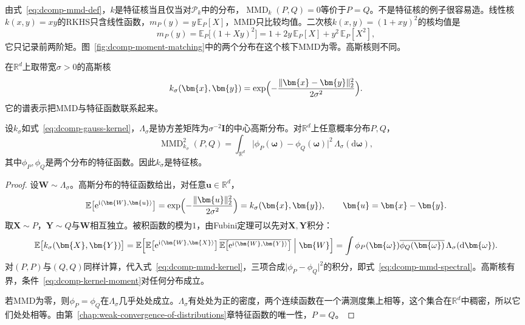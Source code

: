 由式~\eqref{eq:dcomp-mmd-def}，$k$是特征核当且仅当对$\mathcal{P}_k$中的分布，$\operatorname{MMD}_k(P,Q)=0$等价于$P=Q$。不是特征核的例子很容易造。线性核$k(x,y)=xy$的RKHS只含线性函数，$m_P(y)=y\,\mathbb{E}_{P}[X]$，MMD只比较均值。二次核$k(x,y)=(1+xy)^{2}$的核均值是
\[
 m_P(y)=\mathbb{E}_{P}\bigl[(1+Xy)^{2}\bigr]=1+2y\,\mathbb{E}_{P}[X]+y^{2}\,\mathbb{E}_{P}[X^{2}],
\]
它只记录前两阶矩。图~\ref{fig:dcomp-moment-matching}中的两个分布在这个核下MMD为零。高斯核则不同。

在$\mathbb{R}^{d}$上取带宽$\sigma>0$的高斯核
\begin{equation}
 k_\sigma(\bm{x},\bm{y})=\exp\Bigl(-\frac{\lVert\bm{x}-\bm{y}\rVert_2^{2}}{2\sigma^{2}}\Bigr) .
 \label{eq:dcomp-gauss-kernel}
\end{equation}
它的谱表示把MMD与特征函数联系起来。

\begin{theorem}[高斯核的谱表示]
\label{thm:dcomp-gauss-characteristic}
设$k_\sigma$如式~\eqref{eq:dcomp-gauss-kernel}，$\Lambda_\sigma$是协方差矩阵为$\sigma^{-2}\bm{I}$的中心高斯分布。对$\mathbb{R}^{d}$上任意概率分布$P,Q$，
\begin{equation}
 \operatorname{MMD}_{k_\sigma}^{2}(P,Q)=\int_{\mathbb{R}^{d}}\bigl\lvert\phi_P(\bm{\omega})-\phi_Q(\bm{\omega})\bigr\rvert^{2}\,\Lambda_\sigma(\mathrm{d}\bm{\omega}),
 \label{eq:dcomp-mmd-spectral}
\end{equation}
其中$\phi_P,\phi_Q$是两个分布的特征函数。因此$k_\sigma$是特征核。
\end{theorem}

\begin{proof}
设$\bm{W}\sim\Lambda_\sigma$。高斯分布的特征函数给出，对任意$\bm{u}\in\mathbb{R}^{d}$，
\[
 \mathbb{E}\bigl[\mathrm{e}^{\mathrm{i}\langle\bm{W},\bm{u}\rangle}\bigr]=\exp\Bigl(-\frac{\lVert\bm{u}\rVert_2^{2}}{2\sigma^{2}}\Bigr)=k_\sigma(\bm{x},\bm{y}),\qquad\bm{u}=\bm{x}-\bm{y} .
\]
取$\bm{X}\sim P$，$\bm{Y}\sim Q$与$\bm{W}$相互独立。被积函数的模为$1$，由Fubini定理可以先对$\bm{X},\bm{Y}$积分：
\[
 \mathbb{E}\bigl[k_\sigma(\bm{X},\bm{Y})\bigr]=\mathbb{E}\Bigl[\mathbb{E}\bigl[\mathrm{e}^{\mathrm{i}\langle\bm{W},\bm{X}\rangle}\bigr]\,\overline{\mathbb{E}\bigl[\mathrm{e}^{\mathrm{i}\langle\bm{W},\bm{Y}\rangle}\bigr]}\Bigm|\bm{W}\Bigr]=\int\phi_P(\bm{\omega})\overline{\phi_Q(\bm{\omega})}\,\Lambda_\sigma(\mathrm{d}\bm{\omega}) .
\]
对$(P,P)$与$(Q,Q)$同样计算，代入式~\eqref{eq:dcomp-mmd-kernel}，三项合成$\lvert\phi_P-\phi_Q\rvert^{2}$的积分，即式~\eqref{eq:dcomp-mmd-spectral}。高斯核有界，条件~\eqref{eq:dcomp-kernel-moment}对任何分布成立。

若MMD为零，则$\phi_P=\phi_Q$在$\Lambda_\sigma$几乎处处成立。$\Lambda_\sigma$有处处为正的密度，两个连续函数在一个满测度集上相等，这个集合在$\mathbb{R}^{d}$中稠密，所以它们处处相等。由第~\ref{chap:weak-convergence-of-distributions}章特征函数的唯一性，$P=Q$。
\end{proof}

